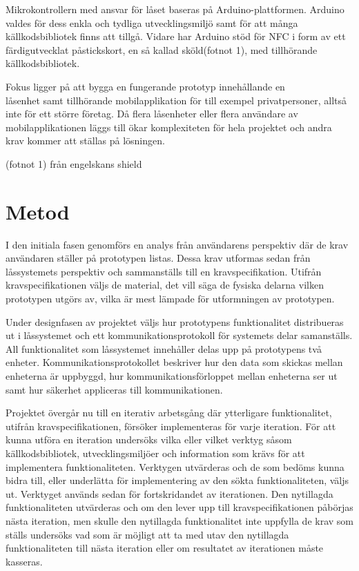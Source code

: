 \documentclass[11pt]{article}
\begin{document}
Mikrokontrollern med ansvar för låset baseras på Arduino-plattformen. Arduino valdes för dess enkla och tydliga utvecklingsmiljö samt för att många källkodsbibliotek finns att tillgå. Vidare har Arduino stöd för NFC i form av ett färdigutvecklat påstickskort, en så kallad sköld(fotnot 1), med tillhörande källkodsbibliotek.

Fokus ligger på att bygga en fungerande prototyp innehållande en\\ låsenhet samt tillhörande mobilapplikation för till exempel privatpersoner, alltså inte för ett större företag. Då flera låsenheter eller flera användare av mobilapplikationen läggs till ökar komplexiteten för hela projektet och andra krav kommer att ställas på lösningen.

(fotnot 1) från engelskans shield


\section{Metod}
I den initiala fasen genomförs en analys från användarens perspektiv där de krav användaren ställer på prototypen listas. Dessa krav utformas sedan från låssystemets perspektiv och sammanställs till en kravspecifikation. Utifrån kravspecifikationen väljs de material, det vill säga de fysiska delarna vilken prototypen utgörs av, vilka är mest lämpade för utformningen av prototypen.

Under designfasen av projektet väljs hur prototypens funktionalitet distribueras ut i låssystemet och ett kommunikationsprotokoll för systemets delar samanställs. All funktionalitet som låssystemet innehåller delas upp på prototypens två enheter. Kommunikationsprotokollet beskriver hur den data som skickas mellan enheterna är uppbyggd, hur kommunikationsförloppet mellan enheterna ser ut samt hur säkerhet appliceras till kommunikationen.

Projektet övergår nu till en iterativ arbetsgång där ytterligare funktionalitet, utifrån kravspecifikationen, försöker implementeras för varje iteration. För att kunna utföra en iteration undersöks vilka eller vilket verktyg såsom källkodsbibliotek, utvecklingsmiljöer och information som krävs för att implementera funktionaliteten. Verktygen utvärderas och de som bedöms kunna bidra till, eller underlätta för implementering av den sökta funktionaliteten, väljs ut. Verktyget används sedan för fortskridandet av iterationen. Den nytillagda funktionaliteten utvärderas och om den lever upp till kravspecifikationen påbörjas nästa iteration, men skulle den nytillagda funktionalitet inte uppfylla de krav som ställs undersöks vad som är möjligt att ta med utav den nytillagda funktionaliteten till nästa iteration eller om resultatet av iterationen måste kasseras. 
\end{document}
